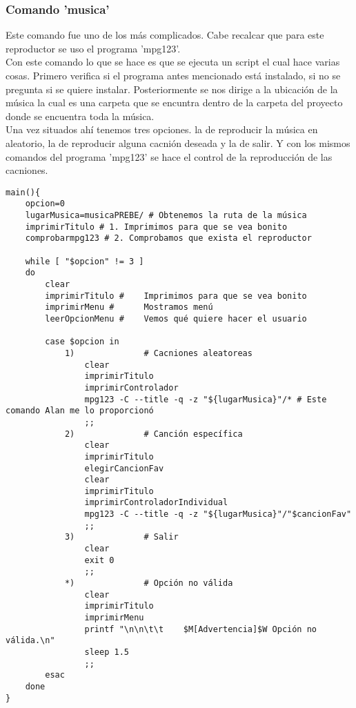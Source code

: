 \documentclass[titlepage]{article}
\begin{document}
\subsubsection{Comando 'musica'}
Este comando fue uno de los más complicados. Cabe recalcar que para este reproductor se uso el programa 'mpg123'.\\
Con este comando lo que se hace es que se ejecuta un script el cual hace varias cosas. Primero verifica si el programa antes mencionado está instalado, si no se pregunta si se quiere instalar. Posteriormente se nos dirige a la ubicación de la música la cual es una carpeta que se encuntra dentro de la carpeta del proyecto donde se encuentra toda la música. \\
Una vez situados ahí tenemos tres opciones. la de reproducir la música en aleatorio, la de reproducir alguna cacnión deseada y la de salir. Y con los mismos comandos del programa 'mpg123' se hace el control de la reproducción de las cacniones.
\begin{verbatim}
main(){
    opcion=0
    lugarMusica=musicaPREBE/ # Obtenemos la ruta de la música
    imprimirTitulo # 1. Imprimimos para que se vea bonito
    comprobarmpg123 # 2. Comprobamos que exista el reproductor

    while [ "$opcion" != 3 ]
    do
        clear
        imprimirTitulo #    Imprimimos para que se vea bonito
        imprimirMenu #      Mostramos menú
        leerOpcionMenu #    Vemos qué quiere hacer el usuario

        case $opcion in
            1)              # Cacniones aleatoreas
                clear
                imprimirTitulo
                imprimirControlador
                mpg123 -C --title -q -z "${lugarMusica}"/* # Este comando Alan me lo proporcionó
                ;;
            2)              # Canción específica
                clear
                imprimirTitulo
                elegirCancionFav
                clear
                imprimirTitulo
                imprimirControladorIndividual
                mpg123 -C --title -q -z "${lugarMusica}"/"$cancionFav"
                ;;
            3)              # Salir
                clear
                exit 0
                ;;
            *)              # Opción no válida
                clear
                imprimirTitulo
                imprimirMenu
                printf "\n\n\t\t    $M[Advertencia]$W Opción no válida.\n"
                sleep 1.5
                ;;
        esac
    done
}
\end{verbatim}
\end{document}

